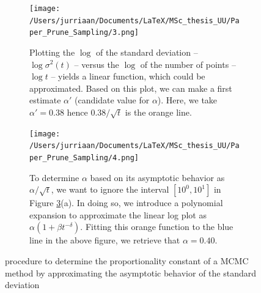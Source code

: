 \documentclass[a4paper, twoside, 11pt]{report}
\theoremstyle{plain}
\theoremstyle{definition}
\theoremstyle{remark}
\begin{document}
\begin{figure}[b!]
\begin{subfigure}[t]{0.5\textwidth}
  \centering
  \captionsetup{width = 0.9\textwidth}
  \texttt{[image: /Users/jurriaan/Documents/LaTeX/MSc\_thesis\_UU/Paper\_Prune\_Sampling/3.png]}
  \caption{Plotting the $\log$ of the standard deviation -- $\log {\sigma}^2(t)$ -- versus the $\log$ of the number of points -- $\log t$ -- yields a linear function, which could be approximated. Based on this plot, we can make a first estimate $\alpha'$ (candidate value for $\alpha$). Here, we take $\alpha' = 0.38$ hence $0.38/\sqrt{t}$ is the orange line.}
  \label{sub_2a}
\end{subfigure}%
\begin{subfigure}[t]{0.5\textwidth}
  \centering
  \captionsetup{width = 0.9\textwidth}
  \texttt{[image: /Users/jurriaan/Documents/LaTeX/MSc\_thesis\_UU/Paper\_Prune\_Sampling/4.png]}
  \caption{To determine $\alpha$ based on its asymptotic behavior as $\alpha / \sqrt{t}$, we want to ignore the interval $[10^0, 10^1]$ in Figure \ref{fig2}(a). In doing so, we introduce a polynomial expansion to approximate the linear log plot as $\alpha(1+\beta t^{-\delta})$. Fitting this orange function to the blue line in the above figure, we retrieve that $\alpha = 0.40$. }
  \label{sub_2b}
\end{subfigure}
\caption{procedure to determine the proportionality constant of a MCMC method by approximating the asymptotic behavior of the standard deviation}
\label{fig2}
\end{figure}
\end{document}
